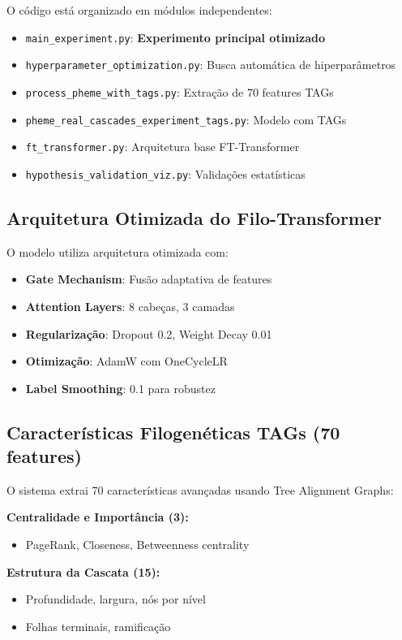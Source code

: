 \documentclass[12pt]{article}
\begin{document}
O c\'odigo est\'a organizado em m\'odulos independentes:
\begin{itemize}
    \item \texttt{main\_experiment.py}: \textbf{Experimento principal otimizado}
    \item \texttt{hyperparameter\_optimization.py}: Busca autom\'atica de hiperpar\^ametros
    \item \texttt{process\_pheme\_with\_tags.py}: Extra\c{c}\~ao de 70 features TAGs
    \item \texttt{pheme\_real\_cascades\_experiment\_tags.py}: Modelo com TAGs
    \item \texttt{ft\_transformer.py}: Arquitetura base FT-Transformer
    \item \texttt{hypothesis\_validation\_viz.py}: Valida\c{c}\~oes estat\'isticas
\end{itemize}

\subsection{Arquitetura Otimizada do Filo-Transformer}

O modelo utiliza arquitetura otimizada com:
\begin{itemize}
    \item \textbf{Gate Mechanism}: Fus\~ao adaptativa de features
    \item \textbf{Attention Layers}: 8 cabe\c{c}as, 3 camadas
    \item \textbf{Regulariza\c{c}\~ao}: Dropout 0.2, Weight Decay 0.01
    \item \textbf{Otimiza\c{c}\~ao}: AdamW com OneCycleLR
    \item \textbf{Label Smoothing}: 0.1 para robustez
\end{itemize}

\subsection{Caracter\'isticas Filogen\'eticas TAGs (70 features)}

O sistema extrai 70 caracter\'isticas avan\c{c}adas usando Tree Alignment Graphs:

\textbf{Centralidade e Import\^ancia (3):}
\begin{itemize}
    \item PageRank, Closeness, Betweenness centrality
\end{itemize}

\textbf{Estrutura da Cascata (15):}
\begin{itemize}
    \item Profundidade, largura, n\'os por n\'ivel
    \item Folhas terminais, ramifica\c{c}\~ao
\end{itemize}
\end{document}
